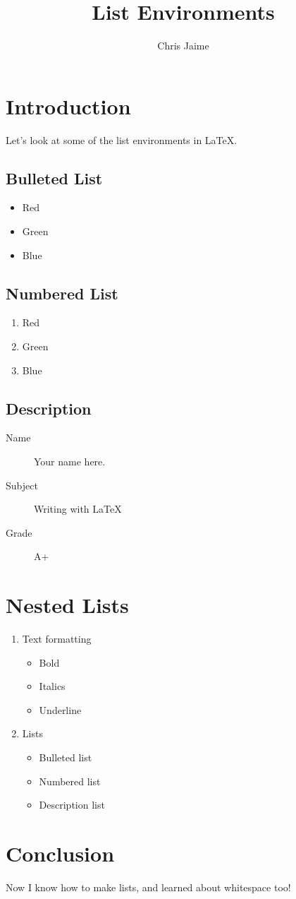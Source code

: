 \documentclass{article}
\title{List Environments}
\author{Chris Jaime}
\date{}
\begin{document}
\maketitle

\section{Introduction}
Let's look at some of the list environments in \LaTeX.


\subsection{Bulleted List}

\begin{itemize}
\item Red
\item Green
\item Blue
\end{itemize}

\subsection{Numbered List}

\begin{enumerate}
\item Red
\item Green
\item Blue
\end{enumerate}

\subsection{Description}

\begin{description}
\item[Name] Your name here.
\item[Subject] Writing with \LaTeX
\item[Grade] A+
\end{description}

\section{Nested Lists}
\begin{enumerate}
\item Text formatting
	\begin{itemize}
	\item Bold
	\item Italics
	\item Underline
	\end{itemize}
\item Lists
	\begin{itemize}
	\item Bulleted list
	\item Numbered list
	\item Description list
	\end{itemize}
\end{enumerate}

\section{Conclusion}
Now I know how to make lists, and learned about whitespace too!
\end{document}

